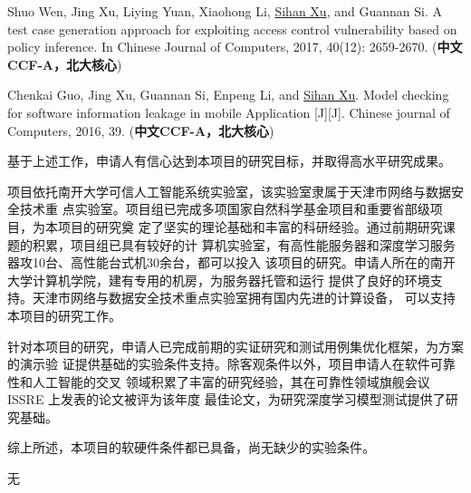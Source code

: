 \documentclass[a4paper,zihao=-4]{article}
\begin{document}
\begin{enumerate}[label={[\arabic*]}]
	\item Shuo Wen, Jing Xu, Liying Yuan, Xiaohong Li, \underline{Sihan Xu}, and
	Guannan Si. A test case generation approach for exploiting access control
	vulnerability based on policy inference. In Chinese Journal of Computers,
	2017, 40(12): 2659-2670. (\textbf{中文CCF-A，北大核心})

	\item Chenkai Guo, Jing Xu, Guannan Si, Enpeng Li, and \underline{Sihan Xu}. Model
	checking for software information leakage in mobile Application [J][J].
	Chinese journal of Computers, 2016, 39. (\textbf{中文CCF-A，北大核心})


\end{enumerate}


基于上述工作，申请人有信心达到本项目的研究目标，并取得高水平研究成果。


项目依托南开大学可信人工智能系统实验室，该实验室隶属于天津市网络与数据安全技术重
点实验室。项目组已完成多项国家自然科学基金项目和重要省部级项目，为本项目的研究奠
定了坚实的理论基础和丰富的科研经验。通过前期研究课题的积累，项目组已具有较好的计
算机实验室，有高性能服务器和深度学习服务器攻10台、高性能台式机30余台，都可以投入
该项目的研究。申请人所在的南开大学计算机学院，建有专用的机房，为服务器托管和运行
提供了良好的环境支持。天津市网络与数据安全技术重点实验室拥有国内先进的计算设备，
可以支持本项目的研究工作。

针对本项目的研究，申请人已完成前期的实证研究和测试用例集优化框架，为方案的演示验
证提供基础的实验条件支持。除客观条件以外，项目申请人在软件可靠性和人工智能的交叉
领域积累了丰富的研究经验，其在可靠性领域旗舰会议 ISSRE 上发表的论文被评为该年度
最佳论文，为研究深度学习模型测试提供了研究基础。

综上所述，本项目的软硬件条件都已具备，尚无缺少的实验条件。


无

\end{document}
